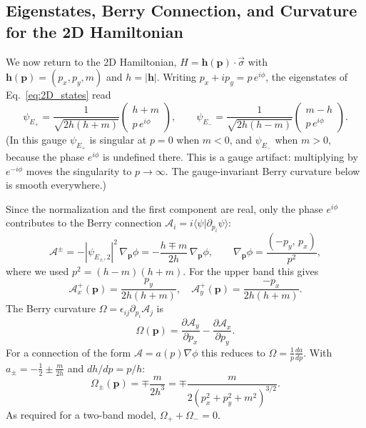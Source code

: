 \documentclass{article}
\begin{document}
    \subsection{Eigenstates, Berry Connection, and Curvature for the 2D Hamiltonian}
    We now return to the 2D Hamiltonian, $H = \mathbf{h}(\mathbf{p}) \cdot \vec{\sigma}$ with $\mathbf{h}(\mathbf{p}) = (p_x, p_y, m)$ and $h = |\mathbf{h}|$. Writing $p_x + i p_y = p\, e^{i\phi}$, the eigenstates of Eq.~\eqref{eq:2D_states} read
    \begin{equation}
        \psi_{E_+} = \frac{1}{\sqrt{2h(h + m)}}\begin{pmatrix} h + m \\ p\, e^{i\phi} \end{pmatrix}, \qquad
        \psi_{E_-} = \frac{1}{\sqrt{2h(h - m)}}\begin{pmatrix} m - h \\ p\, e^{i\phi} \end{pmatrix}.
    \end{equation}
    (In this gauge $\psi_{E_+}$ is singular at $p=0$ when $m<0$, and $\psi_{E_-}$ when $m>0$, because the phase $e^{i\phi}$ is undefined there. This is a gauge artifact: multiplying by $e^{-i\phi}$ moves the singularity to $p\to\infty$. The gauge-invariant Berry curvature below is smooth everywhere.)

    Since the normalization and the first component are real, only the phase $e^{i\phi}$ contributes to the Berry connection $\mathcal{A}_i = i \langle \psi | \partial_{p_i} \psi \rangle$:
    \begin{equation}
        \boldsymbol{\mathcal{A}}^{\pm} = -|\psi_{E_\pm,2}|^2\, \nabla_{\mathbf{p}}\phi
        = -\frac{h \mp m}{2h}\,\nabla_{\mathbf{p}}\phi, \qquad \nabla_{\mathbf{p}}\phi = \frac{(-p_y,\, p_x)}{p^2},
    \end{equation}
    where we used $p^2 = (h-m)(h+m)$. For the upper band this gives
    \begin{equation}
        \mathcal{A}^+_x(\mathbf{p}) = \frac{p_y}{2h(h+m)}, \quad
        \mathcal{A}^+_y(\mathbf{p}) = \frac{-p_x}{2h(h+m)}.
    \end{equation}
    The Berry curvature $\Omega = \epsilon_{ij}\partial_{p_i}\mathcal{A}_j$ is
    \begin{equation}
        \Omega(\mathbf{p}) = \frac{\partial \mathcal{A}_y}{\partial p_x} - \frac{\partial \mathcal{A}_x}{\partial p_y}.
    \end{equation}
    For a connection of the form $\boldsymbol{\mathcal{A}} = a(p)\nabla\phi$ this reduces to $\Omega = \frac{1}{p}\frac{da}{dp}$. With $a_\pm = -\frac{1}{2} \pm \frac{m}{2h}$ and $dh/dp = p/h$:
    \begin{equation}
        \Omega_{\pm}(\mathbf{p}) = \mp\frac{m}{2h^3} = \mp\frac{m}{2(p_x^2 + p_y^2 + m^2)^{3/2}}.
    \end{equation}
    As required for a two-band model, $\Omega_+ + \Omega_- = 0$.
\end{document}
